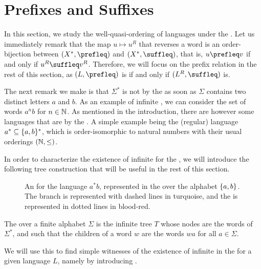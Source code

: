 \section{Prefixes and Suffixes}
\label{prefixes:sec}

In this section, we study the well-quasi-ordering of languages under the
. Let us immediately remark that the map $u \mapsto u^R$
that reverses a word is an order-bijection between $(X^*, \prefleq)$ and $(X^*,
\suffleq)$, that is, $u \prefleq v$ if and only if $u^R \suffleq v^R$.
Therefore, we will focus on the prefix relation in the rest of this section, as
$(L, \prefleq)$ is  if and only if $(L^R, \suffleq)$ is.

The next remark we make is that $\Sigma^*$ is not  by
the  as soon as $\Sigma$ contains two distinct letters $a$
and $b$. As an example of infinite , we can consider the set of
words $a^n b$ for $n \in \mathbb{N}$. As mentioned in the introduction, there are
however some languages  that are  by the . A simple example being the (regular) language $a^* \subseteq
\{ a,b \}^*$, which is order-isomorphic to natural numbers with their usual
orderings $(\mathbb{N}, \leq)$.

In order to characterize the existence of infinite  for the
, we will introduce the following tree construction that
will be useful in the rest of this section.

\begin{figure}
    \centering
    
    \caption{An  for the language $a^* b$,
        represented in the  over the alphabet $\{ a,b \}$.
        The branch is represented with dashed lines in turquoise, and the
         is represented in dotted lines in blood-red.
    }
    \label{antichain-branch:fig}
\end{figure}

\begin{definition}
    The  over a finite alphabet $\Sigma$
    is the infinite tree $T$ whose nodes are the words of $\Sigma^*$, and
    such that the children of a word $w$ are the words $wa$ for all $a \in
    \Sigma$. 
\end{definition}

We will use this  to find simple witnesses
of the existence of infinite  in the 
for a given language $L$, namely by introducing .

